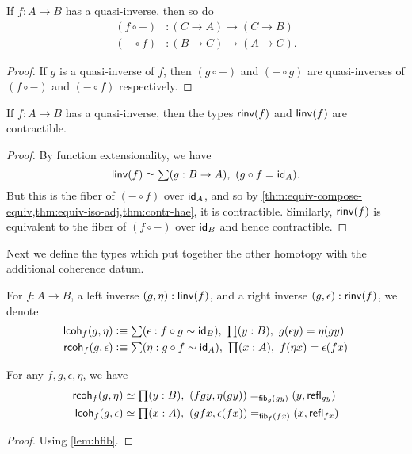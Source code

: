 \begin{lem}\label{thm:equiv-compose-equiv}
  If $f:A\to B$ has a quasi-inverse, then so do
  \begin{align*}
    (f\circ -) &: (C\to A) \to (C\to B)\\
    (-\circ f) &: (B\to C) \to (A\to C).
  \end{align*}
\end{lem}
\begin{proof}
  If $g$ is a quasi-inverse of $f$, then $(g\circ -)$ and $(-\circ g)$ are quasi-inverses of $(f\circ -)$ and $(-\circ f)$ respectively.
\end{proof}

\begin{lem}\label{lem:inv-hprop}
  If $f : A \to B$ has a quasi-inverse, then the types $\rinv(f)$ and $\linv(f)$ are contractible.
\end{lem}
\begin{proof}
  By function extensionality, we have
  \[\eqv{\linv(f)}{\sm{g:B\to A} (g\circ f = \idfunc[A])}.\]
  But this is the fiber of $(-\circ f)$ over $\idfunc[A]$, and so
  by \cref{thm:equiv-compose-equiv,thm:equiv-iso-adj,thm:contr-hae}, it is contractible.
  Similarly, $\rinv(f)$ is equivalent to the fiber of $(f\circ -)$ over $\idfunc[B]$ and hence contractible.
\end{proof}

Next we define the types which put together the other homotopy with the additional coherence datum.

\begin{defn}
For $f : A \to B$, a left inverse $(g,\eta) : \linv(f)$, and a right inverse $(g,\epsilon) : \rinv(f)$, we denote
\begin{align*}
\lcoh{f}{g}{\eta} & \defeq \sm{\epsilon : f\circ g \htpy \idfunc[B]} \prd{y:B} g(\epsilon y) = \eta (gy) \\
\rcoh{f}{g}{\epsilon} & \defeq \sm{\eta : g\circ f \htpy \idfunc[A]} \prd{x:A} f(\eta x) = \epsilon (fx)
\end{align*}
\end{defn}

\begin{lem}\label{lem:coh-hfib}
For any $f,g,\epsilon,\eta$, we have
\begin{align*}
\rcoh{f}{g}{\eta} & \simeq {\prd{y:B} \id[\hfib{g}{gy}]{(fgy,\eta(gy))}{(y,\refl{gy})}} \\
\lcoh{f}{g}{\epsilon} & \simeq {\prd{x:A} \id[\hfib{f}{fx}]{(gfx,\epsilon(fx))}{(x,\refl{fx})}}
\end{align*}
\end{lem}
\begin{proof}
Using \autoref{lem:hfib}.
\end{proof}

